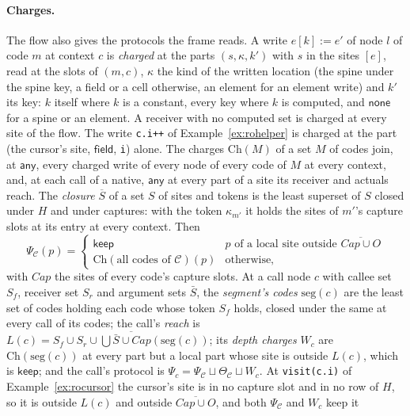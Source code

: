 \documentclass[10pt,a4paper]{article}
\theoremstyle{definition}
\theoremstyle{remark}
\newcommand{\kw}[1]{\mathsf{#1}}
\newcommand{\keep}{\kw{keep}}
\newcommand{\any}{\kw{any}}
\newcommand{\code}[1]{\texttt{#1}}
\newcommand{\kF}{\mathsf{field}}\newcommand{\kC}{\mathsf{cell}}\newcommand{\kE}{\mathsf{elem}}\newcommand{\kS}{\mathsf{spine}}\newcommand{\kI}{\mathsf{id}}
\newcommand{\cC}{\mathcal{C}}
\begin{document}
\paragraph{Charges.} The flow also gives the protocols the frame reads.
A write $e[k]:=e'$ of node $l$ of code $m$ at context $c$ is
\emph{charged} at the parts $(s,\kappa,k')$ with $s$ in the sites $[e]$,
read at the slots of $(m,c)$, $\kappa$ the kind of the written location
(the spine under the spine key, a field or a cell otherwise, an element
for an element write) and $k'$ its key: $k$ itself where $k$ is a
constant, every key where $k$ is computed, and $\kw{none}$ for a spine or
an element. A receiver with no computed set is charged at every site of
the flow. The write \code{c.i++} of Example~\ref{ex:rohelper} is
charged at the part (the cursor's site, $\kF$, \code{i}) alone. The charges
$\mathrm{Ch}(M)$ of a set $M$ of codes join, at $\any$, every charged
write of every node of every code of $M$ at every context, and, at each
call of a native, $\any$ at every part of a site its receiver and actuals
reach. The \emph{closure}
$\overline S$ of a set $S$ of sites and tokens is the least superset of
$S$ closed under $H$ and under captures: with the token $\kappa_{m'}$ it
holds the sites of $m'$'s capture slots at its entry at every context.
Then
\[
\Psi_\cC(p)=\begin{cases}\keep & p\text{ of a local site outside }\overline{\mathit{Cap}\cup O}\\ \mathrm{Ch}(\text{all codes of }\cC)(p) & \text{otherwise,}\end{cases}
\]
with $\mathit{Cap}$ the sites of every code's capture slots. At a call
node $c$ with callee set $S_f$, receiver set $S_r$ and argument sets
$\bar S$, the \emph{segment's codes} $\mathrm{seg}(c)$ are the least set of
codes holding each code whose token $S_f$ holds, closed under the same at
every call of its codes;
the call's \emph{reach} is
$L(c)=\overline{S_f\cup S_r\cup\bigcup\bar S\cup\mathit{Cap}(\mathrm{seg}(c))}$;
its \emph{depth charges} $W_c$ are $\mathrm{Ch}(\mathrm{seg}(c))$ at
every part but a local part whose site is outside $L(c)$, which is
$\keep$; and the call's protocol is
$\Psi_c=\Psi_\cC\sqcup\Theta_\cC\sqcup W_c$. At \code{visit(c.i)} of
Example~\ref{ex:rocursor} the cursor's site is in no capture slot and in no row of $H$, so it is
outside $L(c)$ and outside $\overline{\mathit{Cap}\cup O}$, and both
$\Psi_\cC$ and $W_c$ keep it
\end{document}

